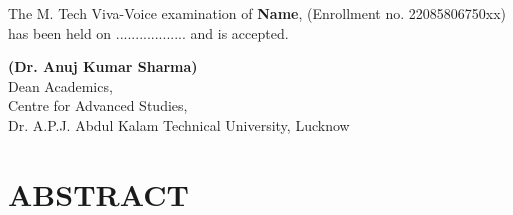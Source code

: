 \documentclass[a4paper, 12pt]{report}
\begin{document}
			\noindent The M. Tech Viva-Voice examination of \textbf{Name}, (Enrollment no. 22085806750xx) has been held on .................. and is accepted.\\[0.1cm]
			\begin{flushright}
				\textbf{(Dr. Anuj Kumar Sharma)}\\
				Dean Academics,\\
				Centre for Advanced Studies,\\
				Dr. A.P.J. Abdul Kalam Technical University, Lucknow
			\end{flushright}
			
		\chapter*{\fontsize{14}{17} \selectfont \centering ABSTRACT}
			
\end{document}
